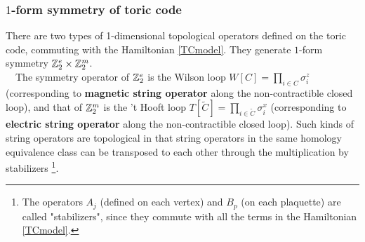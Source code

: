 \documentclass{ltjsarticle}
\theoremstyle{mystyle} %
\numberwithin{equation}{section}
\begin{document}
\subsubsection{$1$-form symmetry of toric code}
There are two types of 1-dimensional topological operators defined on the toric code, 
commuting with the Hamiltonian \eqref{TCmodel}. 
They generate $1$-form symmetry $\mathbb{Z}^e_2\times \mathbb{Z}^m_2$.\\
　The symmetry operator of $\mathbb{Z}^e_2$ is the Wilson loop 
$W[C]=\prod_{i\in C}\sigma^z_i$
 (corresponding to \textbf{magnetic string operator} along the non-contractible closed loop), 
and that of $\mathbb{Z}^m_2$ is the 't Hooft loop 
$T[\tilde{C}]=\prod_{i\in \tilde{C}}\sigma^x_i$
(corresponding to \textbf{electric string operator} along the non-contractible closed loop). 
Such kinds of string operators are topological in that 
string operators in the same homology equivalence class 
can be transposed to each other through the multiplication by stabilizers
\footnote{
    The operators $A_j$ (defined on each vertex) and $B_p$ (on each plaquette) are called "stabilizers", 
    since they commute with all the terms in the Hamiltonian \eqref{TCmodel}. 
}. 
\end{document}
